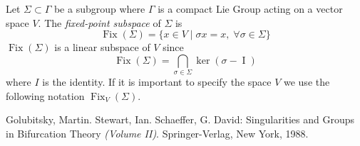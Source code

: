 \documentclass[12pt]{article}
\begin{document}
Let $\Sigma \subset \Gamma$ be a subgroup where $\Gamma$ is a compact Lie Group acting on a vector space $V$.  The \emph{fixed-point subspace} of $\Sigma$ is $$\operatorname{Fix}(\Sigma) = \{ x \in V \mid \sigma x = x,\; \forall \sigma \in \Sigma\}$$
$\operatorname{Fix}(\Sigma)$ is a linear subspace of $V$ since $$\operatorname{Fix}(\Sigma) = \bigcap_{\sigma \in \Sigma} \operatorname{ker}(\sigma - \operatorname{I})$$ where $I$ is the identity.  If it is important to specify the space $V$ we use the following notation $\operatorname{Fix}_V(\Sigma)$.

\begin{thebibliography}{1}
 Golubitsky, Martin. Stewart, Ian. Schaeffer, G. David: Singularities and Groups in Bifurcation Theory \textit{(Volume II)}. Springer-Verlag, New York, 1988.
\end{thebibliography}
\end{document}
